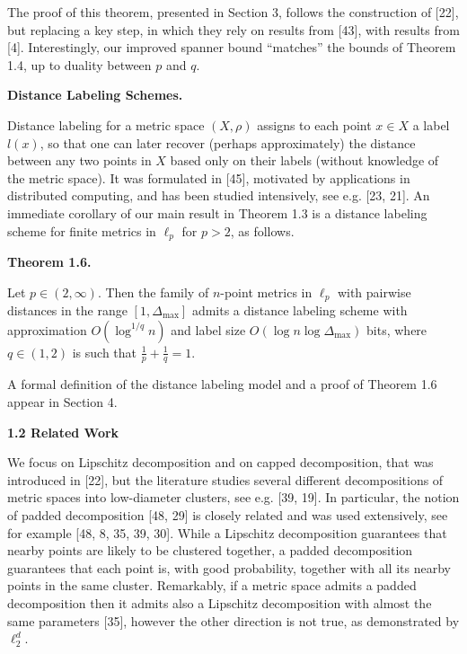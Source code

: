 \par
The proof of this theorem, presented in Section 3, follows the construction of [22], but replacing a key step, in which they rely on results from [43], with results from [4]. Interestingly, our improved spanner bound “matches” the bounds of Theorem 1.4, up to duality between $p$ and $q$.
\par
\par
\par
\par\medskip\noindent\textbf{Distance Labeling Schemes.}\par
Distance labeling for a metric space $(X,\rho)$ assigns to each point $x\in X$ a label $l(x)$, so that one can later recover (perhaps approximately) the distance between any two points in $X$ based only on their labels (without knowledge of the metric space). It was formulated in [45], motivated by applications in distributed computing, and has been studied intensively, see e.g. [23, 21]. An immediate corollary of our main result in Theorem 1.3 is a distance labeling scheme for finite metrics in $\ell_{p}$ for $p>2$, as follows.
\par
\par
\par\medskip\noindent\textbf{Theorem 1.6.}\par
Let $p\in(2,\infty)$. Then the family of $n$-point metrics in $\ell_{p}$ with pairwise distances in the range $[1,\Delta_{\text{max}}]$ admits a distance labeling scheme with approximation $O(\log^{1/q}{n})$ and label size $O(\log{n}\log{\Delta_{\text{max}}})$ bits, where $q\in(1,2)$ is such that $\frac{1}{p}+\frac{1}{q}=1$.
\par
\par
\par
A formal definition of the distance labeling model and a proof of Theorem 1.6 appear in Section 4.
\par
\par
\par
\par
\par\medskip\noindent\textbf{1.2 Related Work}\par
We focus on Lipschitz decomposition and on capped decomposition, that was introduced in [22], but the literature studies several different decompositions of metric spaces into low-diameter clusters, see e.g. [39, 19]. In particular, the notion of padded decomposition [48, 29] is closely related and was used extensively, see for example [48, 8, 35, 39, 30]. While a Lipschitz decomposition guarantees that nearby points are likely to be clustered together, a padded decomposition guarantees that each point is, with good probability, together with all its nearby points in the same cluster. Remarkably, if a metric space admits a padded decomposition then it admits also a Lipschitz decomposition with almost the same parameters [35], however the other direction is not true, as demonstrated by $\ell_{2}^{d}$.
